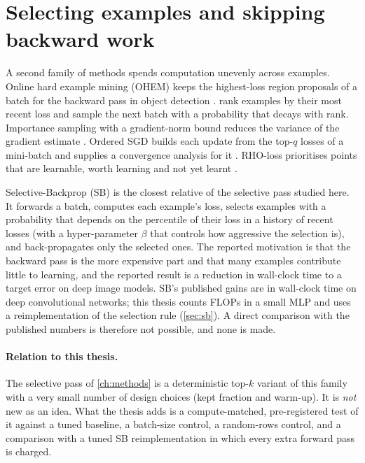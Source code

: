 \section{Selecting examples and skipping backward work}\label{sec:related-selection}
A second family of methods spends computation unevenly across examples. Online hard example mining (OHEM) keeps the highest-loss region proposals of a batch for the backward pass in object detection \citep{shrivastava2016ohem}. \citet{loshchilov2016online} rank examples by their most recent loss and sample the next batch with a probability that decays with rank. Importance sampling with a gradient-norm bound reduces the variance of the gradient estimate \citep{katharopoulos2018not}. Ordered SGD builds each update from the top-$q$ losses of a mini-batch and supplies a convergence analysis for it \citep{kawaguchi2020ordered}. RHO-loss prioritises points that are learnable, worth learning and not yet learnt \citep{mindermann2022prioritized}.

Selective-Backprop (SB) \citep{jiang2019selective} is the closest relative of the selective pass studied here. It forwards a batch, computes each example's loss, selects examples with a probability that depends on the percentile of their loss in a history of recent losses (with a hyper-parameter $\beta$ that controls how aggressive the selection is), and back-propagates only the selected ones. The reported motivation is that the backward pass is the more expensive part and that many examples contribute little to learning, and the reported result is a reduction in wall-clock time to a target error on deep image models. SB's published gains are in wall-clock time on deep convolutional networks; this thesis counts FLOPs in a small MLP and uses a reimplementation of the selection rule (\cref{sec:sb}). A direct comparison with the published numbers is therefore not possible, and none is made.

\paragraph{Relation to this thesis.} The selective pass of \cref{ch:methods} is a deterministic top-$k$ variant of this family with a very small number of design choices (kept fraction and warm-up). It is \emph{not} new as an idea. What the thesis adds is a compute-matched, pre-registered test of it against a tuned baseline, a batch-size control, a random-rows control, and a comparison with a tuned SB reimplementation in which every extra forward pass is charged.

